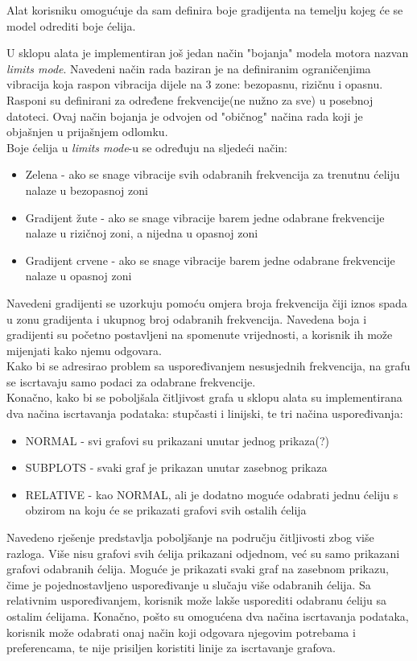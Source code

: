\documentclass[times, utf8, diplomski]{fer}
\begin{document}
Alat korisniku omogućuje da sam definira boje gradijenta na temelju kojeg će se model odrediti boje ćelija.

U sklopu alata je implementiran još jedan način "bojanja" modela motora nazvan \textit{limits mode}. Navedeni način rada baziran je na definiranim ograničenjima vibracija koja raspon vibracija dijele na 3 zone: bezopasnu, rizičnu i opasnu. Rasponi su definirani za određene frekvencije(ne nužno za sve) u posebnoj datoteci. Ovaj način bojanja je odvojen od "običnog" načina rada koji je objašnjen u prijašnjem odlomku. 
\\
Boje ćelija u \textit{limits mode}-u se određuju na sljedeći način:
\begin{itemize}
\item Zelena - ako se snage vibracije svih odabranih frekvencija za trenutnu ćeliju nalaze u bezopasnoj zoni
\item Gradijent žute - ako se snage vibracije barem jedne odabrane frekvencije nalaze u rizičnoj zoni, a nijedna u opasnoj zoni
\item Gradijent crvene - ako se snage vibracije barem jedne odabrane frekvencije nalaze u opasnoj zoni\\
\end{itemize}
Navedeni gradijenti se uzorkuju pomoću omjera broja frekvencija čiji iznos spada u zonu gradijenta i ukupnog broj odabranih frekvencija. Navedena boja i gradijenti su početno postavljeni na spomenute vrijednosti, a korisnik ih može mijenjati kako njemu odgovara.\\
Kako bi se adresirao problem sa uspoređivanjem nesusjednih frekvencija, na grafu se iscrtavaju samo podaci za odabrane frekvencije.\\
Konačno, kako bi se poboljšala čitljivost grafa u sklopu alata su implementirana dva načina iscrtavanja podataka: stupčasti i linijski, te tri načina uspoređivanja:
\begin{itemize}
\item NORMAL - svi grafovi su prikazani unutar jednog prikaza(?)
\item SUBPLOTS - svaki graf je prikazan unutar zasebnog prikaza
\item RELATIVE - kao NORMAL, ali je dodatno moguće odabrati jednu ćeliju s obzirom na koju će se prikazati grafovi svih ostalih ćelija\\
\end{itemize}
Navedeno rješenje predstavlja poboljšanje na području čitljivosti zbog više razloga. Više nisu grafovi svih ćelija prikazani odjednom, već su samo prikazani grafovi odabranih ćelija. Moguće je prikazati svaki graf na zasebnom prikazu, čime je pojednostavljeno uspoređivanje u slučaju više odabranih ćelija. Sa relativnim uspoređivanjem, korisnik može lakše usporediti odabranu ćeliju sa ostalim ćelijama. Konačno, pošto su omogućena dva načina iscrtavanja podataka, korisnik može odabrati onaj način koji odgovara njegovim potrebama i preferencama, te nije prisiljen koristiti linije za iscrtavanje grafova.
\end{document}
